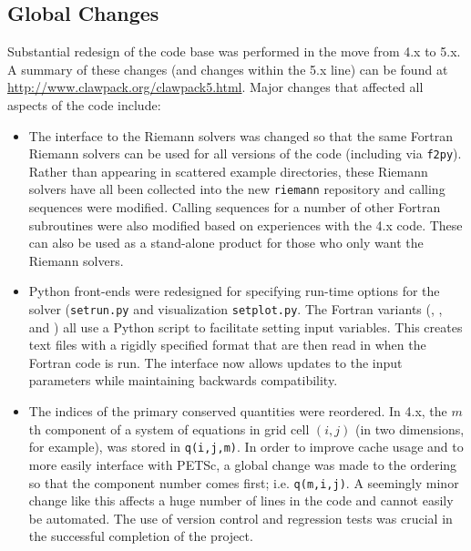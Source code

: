 %
%
%

\subsection{Global Changes}
Substantial redesign of the \clawpack code base was performed in the move
from \clawpack 4.x to 5.x.  A summary of these changes (and changes within
the 5.x line) can be found at \url{http://www.clawpack.org/clawpack5.html}.
Major changes that affected all aspects of the code include:
\begin{itemize}
    \item The interface to the Riemann solvers was changed so that the same Fortran
    Riemann solvers can be used for all versions of the code (including \pyclaw
    via \texttt{f2py}).  Rather than appearing in scattered example directories,
    these Riemann solvers have all been collected into the new
    \texttt{riemann} repository and calling sequences were modified.  Calling
    sequences for a number of other Fortran subroutines were also modified based
    on experiences with the \clawpack 4.x code.  These can also be used as a
    stand-alone product for those who only want the Riemann solvers.
    \item Python front-ends were redesigned for specifying run-time options for
    the solver (\texttt{setrun.py} and visualization \texttt{setplot.py}.  The
    Fortran variants (\classic, \amrclaw, and \geoclaw) all use a Python script
    to facilitate setting input variables.  This creates text files with a
    rigidly specified format that are then read in when the Fortran code is run.
    The interface now allows updates to the input parameters while maintaining
    backwards compatibility.
    \item The indices of the primary conserved quantities were reordered.  In
    \clawpack 4.x, the $m$th component of a
    system of equations in grid cell $(i,j)$ (in two dimensions, for example),
    was stored in \texttt{q(i,j,m)}.  In order to improve cache usage and to
    more easily interface with PETSc, a global
    change was made to the ordering so that the component number comes
    first; i.e. \texttt{q(m,i,j)}.  A seemingly minor change like this affects a
    huge number of lines in the code and cannot easily be automated. The use of
    version control and regression tests was crucial in the successful
    completion of the project.
\end{itemize}
